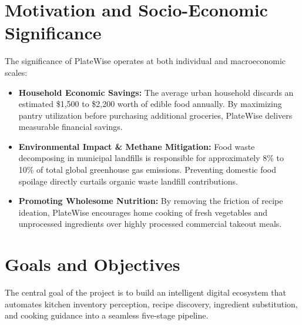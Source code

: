 \section{Motivation and Socio-Economic Significance}
The significance of PlateWise operates at both individual and macroeconomic scales:
\begin{itemize}
    \item \textbf{Household Economic Savings:} The average urban household discards an estimated \$1,500 to \$2,200 worth of edible food annually. By maximizing pantry utilization before purchasing additional groceries, PlateWise delivers measurable financial savings.
    \item \textbf{Environmental Impact \& Methane Mitigation:} Food waste decomposing in municipal landfills is responsible for approximately 8\% to 10\% of total global greenhouse gas emissions. Preventing domestic food spoilage directly curtails organic waste landfill contributions.
    \item \textbf{Promoting Wholesome Nutrition:} By removing the friction of recipe ideation, PlateWise encourages home cooking of fresh vegetables and unprocessed ingredients over highly processed commercial takeout meals.
\end{itemize}

\section{Goals and Objectives}
The central goal of the project is to build an intelligent digital ecosystem that automates kitchen inventory perception, recipe discovery, ingredient substitution, and cooking guidance into a seamless five-stage pipeline.

